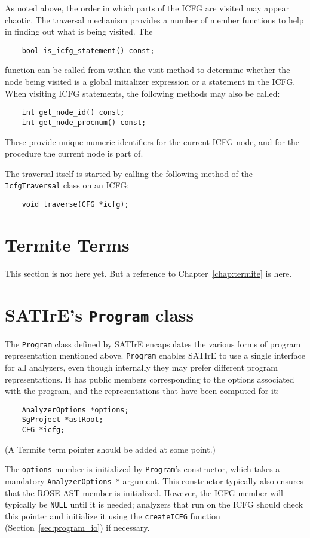 \documentclass[a4paper,12pt]{report}
\begin{document}
As noted above, the order in which parts of the ICFG are visited may appear
chaotic. The traversal mechanism provides a number of member functions to
help in finding out what is being visited. The
\begin{verbatim}
    bool is_icfg_statement() const;
\end{verbatim}
function can be called from within the visit method to determine whether the
node being visited is a global initializer expression or a statement in the
ICFG. When visiting ICFG statements, the following methods may also be
called:
\begin{verbatim}
    int get_node_id() const;
    int get_node_procnum() const;
\end{verbatim}
These provide unique numeric identifiers for the current ICFG node, and for
the procedure the current node is part of.

The traversal itself is started by calling the following method of the
\texttt{IcfgTraversal} class on an ICFG:
\begin{verbatim}
    void traverse(CFG *icfg);
\end{verbatim}

\section{Termite Terms}
\label{sec:representation_termite}

This section is not here yet. But a reference to Chapter~\ref{chap:termite}
is here.

\section{SATIrE's \texttt{Program} class}
\label{sec:satire_program}

The \texttt{Program} class defined by SATIrE encapsulates the various forms
of program representation mentioned above. \texttt{Program} enables SATIrE
to use a single interface for all analyzers, even though internally they may
prefer different program representations. It has public members
corresponding to the options associated with the program, and the
representations that have been computed for it:
\begin{verbatim}
    AnalyzerOptions *options;
    SgProject *astRoot;
    CFG *icfg;
\end{verbatim}
(A Termite term pointer should be added at some point.)

The \texttt{options} member is initialized by \texttt{Program}'s
constructor, which takes a mandatory \verb|AnalyzerOptions *| argument. This
constructor typically also ensures that the ROSE AST member is initialized.
However, the ICFG member will typically be \texttt{NULL} until it is needed;
analyzers that run on the ICFG should check this pointer and initialize it
using the \texttt{createICFG} function (Section~\ref{sec:program_io}) if
necessary.
\end{document}
